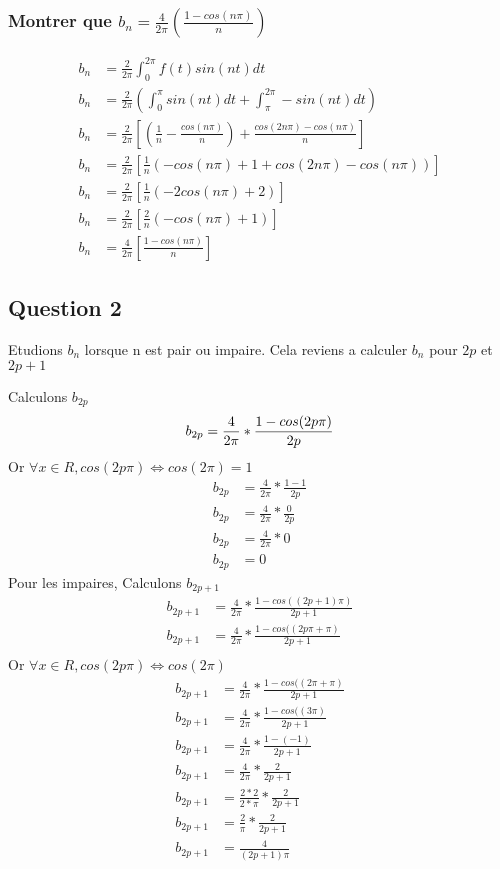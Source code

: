 \documentclass[a4paper,10pt]{report}
\begin{document}
\subsubsection{Montrer que $b_n = \frac{4}{2\pi}(\frac{1-cos(n\pi)}{n})$}
\begin{align*}
b_n &= \frac{2}{2\pi} \int_{0}^{2\pi} f(t) sin(nt) dt\\
b_n &= \frac{2}{2\pi} (\int_{0}^{\pi} sin(nt) dt + \int_{\pi}^{2\pi} -sin(nt) dt)\\
b_n &= \frac{2}{2\pi} [(\frac{1}{n} - \frac{cos(n\pi)}{n}) + \frac{cos(2n\pi) - cos(n\pi)}{n}]\\
b_n &= \frac{2}{2\pi} [\frac{1}{n} (-cos(n\pi) + 1 + cos(2n\pi) - cos(n\pi))]\\
b_n &= \frac{2}{2\pi} [\frac{1}{n} (-2cos(n\pi) + 2)]\\
b_n &= \frac{2}{2\pi} [\frac{2}{n} (-cos(n\pi) + 1)]\\
b_n &= \frac{4}{2\pi} [\frac{1 - cos(n\pi)}{n}]
\end{align*}

\subsection{Question 2}
Etudions $b_n$ lorsque n est pair ou impaire.
Cela reviens a calculer $b_n$ pour $2p$ et $2p+1$

Calculons $b_{2p}$
\begin{equation*}
b_{2p} = \frac{4}{2\pi}*\frac{1-cos(2p\pi)}{2p}\\
\end{equation*}
Or $\forall x  	\in R, cos(2p\pi) \Leftrightarrow  cos(2\pi) = 1$
\begin{align*}
b_{2p} &= \frac{4}{2\pi}*\frac{1-1}{2p}\\
b_{2p} &= \frac{4}{2\pi}*\frac{0}{2p}\\
b_{2p} &= \frac{4}{2\pi}*0\\
b_{2p} &= 0
\end{align*}
\bigskip
Pour les impaires, Calculons $b_{2p+1}$
\begin{align*}
b_{2p+1} &= \frac{4}{2\pi}*\frac{1-cos((2p+1)\pi)}{2p+1}\\
b_{2p+1} &= \frac{4}{2\pi}*\frac{1-cos((2p\pi+\pi)}{2p+1}\\
\end{align*}
Or $\forall x  	\in R, cos(2p\pi) \Leftrightarrow  cos(2\pi)$
\begin{align*}
b_{2p+1} &= \frac{4}{2\pi}*\frac{1-cos((2\pi+\pi)}{2p+1}\\
b_{2p+1} &= \frac{4}{2\pi}*\frac{1-cos((3\pi)}{2p+1}\\
b_{2p+1} &= \frac{4}{2\pi}*\frac{1-(-1)}{2p+1}\\
b_{2p+1} &= \frac{4}{2\pi}*\frac{2}{2p+1}\\
b_{2p+1} &= \frac{2*2}{2*\pi}*\frac{2}{2p+1}\\
b_{2p+1} &= \frac{2}{\pi}*\frac{2}{2p+1}\\
b_{2p+1} &= \frac{4}{(2p+1)\pi}
\end{align*}
\end{document}
